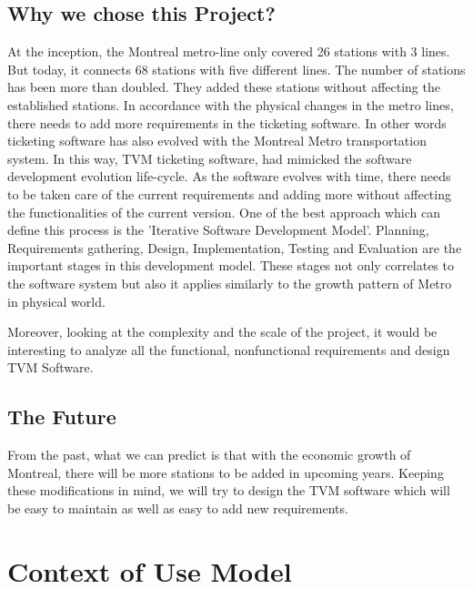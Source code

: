 \documentclass[15pt]{article}
\begin{document}
\subsection{\Large{Why we chose this Project?}}
At the inception, the Montreal metro-line only covered 26 stations with 3 lines\cite{chan2013station}. But today, it connects 68 stations with five different lines. The number of stations has been more than doubled. They added these stations without affecting the established stations. In accordance with the physical changes in the metro lines, there needs to add more requirements in the ticketing software. In other words ticketing software has also evolved with the Montreal Metro transportation system. In this way, TVM ticketing software, had mimicked the software development evolution life-cycle. As the software evolves with time, there needs to be taken care of the current requirements and adding more without affecting the functionalities of the current version. One of the best approach which can define this process is the ’Iterative Software Development Model’. Planning, Requirements gathering, Design,  Implementation, Testing and Evaluation are the important stages in this development model. These stages not only correlates to the software system but also it applies similarly to the growth pattern of Metro in physical world.\par
Moreover, looking at the complexity and the scale of the project, it would be interesting to analyze all the functional, nonfunctional requirements and design TVM Software\citep{alexander2009discovering}.
\subsection{\Large{The Future}}
From the past, what we can predict is that with the economic growth of Montreal, there will be more stations to be added in upcoming years. Keeping these modifications in mind, we will try to design the TVM software which will be easy to maintain as well as easy to add new requirements\cite{laplante2017requirements}.


\section{\Large{Context of Use Model}}
\end{document}
